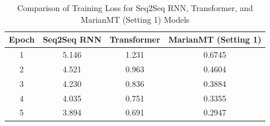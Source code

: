 \documentclass{article}
\begin{document}
\begin{table}[H]
\centering
\begin{tabular}{|c|c|c|c|}
\hline
\textbf{Epoch} & \textbf{Seq2Seq RNN} & \textbf{Transformer} & \textbf{MarianMT (Setting 1)} \\
\hline
1 & 5.146 & 1.231 & 0.6745 \\
2 & 4.521 & 0.963 & 0.4604 \\
3 & 4.230 & 0.836 & 0.3884 \\
4 & 4.035 & 0.751 & 0.3355 \\
5 & 3.894 & 0.691 & 0.2947 \\
\hline
\end{tabular}
\caption{Comparison of Training Loss for Seq2Seq RNN, Transformer, and MarianMT (Setting 1) Models}
\end{table}
\end{document}
